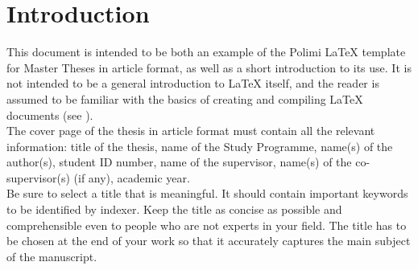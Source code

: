 \documentclass[11pt,a4paper]{article}
\begin{document}



\section{Introduction}
\label{sec:introduction}
This document is intended to be both an example of the Polimi \LaTeX{} template for Master Theses in article format,
as well as a short introduction to its use. It is not intended to be a general introduction to \LaTeX{} itself,
and the reader is assumed to be familiar with the basics of creating and compiling \LaTeX{} documents (see \cite{oetiker1995not, kottwitz2015latex}).
\\
The cover page of the thesis in article format must contain all the relevant information:
title of the thesis, name of the Study Programme, name(s) of the author(s),
student ID number, name of the supervisor, name(s) of the co-supervisor(s) (if any), academic year.
\\
Be sure to select a title that is meaningful.
It should contain important keywords to be identified by indexer.
Keep the title as concise as possible and comprehensible even to people who are not experts in your field.
The title has to be chosen at the end of your work so that it accurately captures the main subject of the manuscript.
\end{document}
